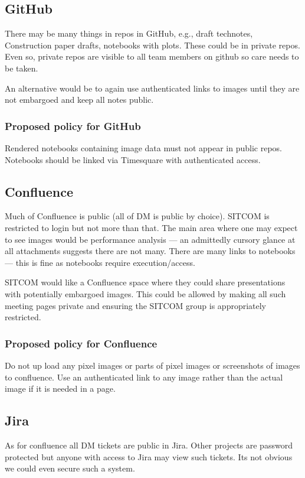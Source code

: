\subsection{GitHub}
There may be many things in repos in GitHub, e.g., draft technotes, Construction paper drafts, notebooks with plots.
These could be in private repos.
Even so, private repos are visible to all team members on github so care needs to be taken.

An alternative would be to again use authenticated links to images until they are not embargoed and keep all notes public.

\subsubsection{Proposed policy for GitHub}
Rendered notebooks containing image data must not appear in public repos.
Notebooks should be linked via Timesquare with authenticated access.

\subsection{Confluence}
Much of Confluence is public (all of DM is public by choice).
SITCOM is restricted to login but not more than that.
The main area where one may expect to see images would be performance analysis --- an admittedly cursory glance at all attachments suggests there are not many.
There are many links to notebooks --- this is fine as notebooks require execution/access.

SITCOM would like a Confluence space where they could share presentations with potentially embargoed images.
This could be allowed by making all such meeting pages private and ensuring the SITCOM group is appropriately restricted.

\subsubsection{Proposed policy for Confluence}
Do not up load any pixel images or parts of pixel images or screenshots of images to confluence.
Use an authenticated link to any image rather than the actual image if it is needed in a page.

\subsection{Jira}
As for confluence all DM tickets are public in Jira.
Other projects are password protected but anyone with access to Jira may view such tickets.
Its not obvious we could even secure such a system.

